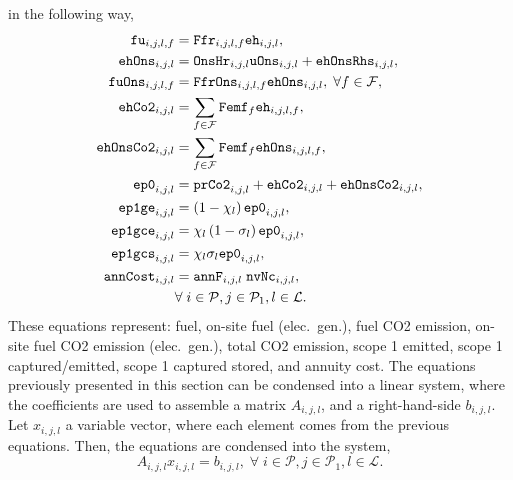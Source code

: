 \documentclass{amsart}
\begin{document}
in the following way,
%
\begin{align}\label{eq:eqset2}
    \mathtt{fu}_{i,j,l,f} &= 
    \mathtt{Ffr}_{i,j,l,f} \mathtt{eh}_{i,j,l}, \\
    \mathtt{ehOns}_{i,j,l} &= 
    \mathtt{OnsHr}_{i,j,l} \mathtt{uOns}_{i,j,l} + \mathtt{ehOnsRhs}_{i,j,l}, \\
    \mathtt{fuOns}_{i,j,l,f} &= 
    \mathtt{FfrOns}_{i,j,l,f} \mathtt{ehOns}_{i,j,l}, \; \forall f \in
    \mathcal{F}, \\
    \mathtt{ehCo2}_{i,j,l} &= 
    \sum_{f \in \mathcal{F}} \mathtt{Femf}_{f} \mathtt{eh}_{i,j,l,f}, \\
    \mathtt{ehOnsCo2}_{i,j,l} &= 
    \sum_{f \in \mathcal{F}} \mathtt{Femf}_{f} \mathtt{ehOns}_{i,j,l,f}  , \\
    \mathtt{ep0}_{i,j,l} &= \mathtt{prCo2}_{i,j,l} 
    + \mathtt{ehCo2}_{i,j,l}
    + \mathtt{ehOnsCo2}_{i,j,l}, \\
    \mathtt{ep1ge}_{i,j,l} &= \left(1-\chi_{l}\right) \mathtt{ep0}_{i,j,l}, \\
    \mathtt{ep1gce}_{i,j,l} &= 
    \chi_{l} \left(1-\sigma_{l}\right) \mathtt{ep0}_{i,j,l}, \\
    \mathtt{ep1gcs}_{i,j,l} &= 
    \chi_{l} \sigma_{l} \mathtt{ep0}_{i,j,l}, \\
    \mathtt{annCost}_{i,j,l} &= 
    \mathtt{annF}_{i,j,l}\; \mathtt{nvNc}_{i,j,l}, \\
    & \forall \; i \in \mathcal{P},j \in \mathcal{P}_1 ,
    l \in \mathcal{L}. \notag
\end{align}
%
These equations represent: fuel, on-site fuel (elec.\ gen.), fuel CO2 emission,
on-site fuel CO2 emission (elec.\ gen.), total CO2 emission, scope 1 emitted,
scope 1 captured/emitted, scope 1 captured stored, and annuity cost. 
%
The equations previously presented in this section can be condensed into a
linear system, where the coefficients are used to assemble a matrix $A_{i,j,l}$,
and a right-hand-side $b_{i,j,l}$. Let $x_{i,j,l}$  a variable vector, where
each element comes from the previous equations. Then, the equations are
condensed into the system,
%
\begin{equation}\label{eq:base_sys}
    A_{i,j,l} x_{i,j,l} = b_{i,j,l},
    \; \forall \; i \in \mathcal{P},j \in \mathcal{P}_1 , l \in \mathcal{L}.
\end{equation}
%
\end{document}
